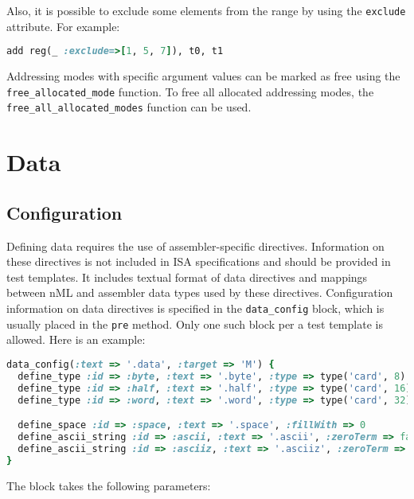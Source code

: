 \documentclass[oneside,final,12pt]{extreport}
\begin{document}
Also, it is possible to exclude some elements from the range by using the {\tt exclude}
attribute. For example:

\begin{lstlisting}[language=ruby, emph={situation, mode_allocator}]
add reg(_ :exclude=>[1, 5, 7]), t0, t1
\end{lstlisting}

Addressing modes with specific argument values can be marked as free using the
{\tt free{\_}allocated{\_}mode} function. To free all allocated addressing modes,
the  {\tt free{\_}all{\_}allocated{\_}modes} function can be used.


\section{Data}

\subsection{Configuration}

Defining data requires the use of assembler-specific directives. Information on
these directives is not included in ISA specifications and should be provided in test
templates. It includes textual format of data directives and mappings between nML and
assembler data types used by these directives. Configuration information on data
directives is specified in the \texttt{data{\_}config} block, which is usually placed
in the \texttt{pre} method. Only one such block per a test template is allowed.
Here is an example:

\begin{lstlisting}[language=ruby]
data_config(:text => '.data', :target => 'M') {
  define_type :id => :byte, :text => '.byte', :type => type('card', 8)
  define_type :id => :half, :text => '.half', :type => type('card', 16)
  define_type :id => :word, :text => '.word', :type => type('card', 32)

  define_space :id => :space, :text => '.space', :fillWith => 0
  define_ascii_string :id => :ascii, :text => '.ascii', :zeroTerm => false
  define_ascii_string :id => :asciiz, :text => '.asciiz', :zeroTerm => true
}
\end{lstlisting}

The block takes the following parameters:
\end{document}
